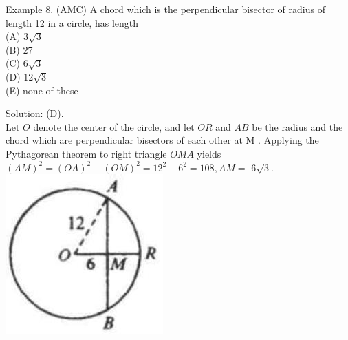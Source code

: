 \documentclass[10pt]{article}
\begin{document}
Example 8. (AMC) A chord which is the perpendicular bisector of radius of length 12 in a circle, has length\\
(A) \(3 \sqrt{3}\)\\
(B) 27\\
(C) \(6 \sqrt{3}\)\\
(D) \(12 \sqrt{3}\)\\
(E) none of these

Solution: (D).\\
Let \(O\) denote the center of the circle, and let \(O R\) and \(A B\) be the radius and the chord which are perpendicular bisectors of each other at M . Applying the Pythagorean theorem to right triangle \(O M A\) yields \((A M)^{2}=(O A)^{2}-(O M)^{2}=12^{2}-6^{2}=108, A M=\) \(6 \sqrt{3}\).\\
\includegraphics[max width=\textwidth, center]{2025_04_17_97bc1f7e44d93c271a88g-150(1)}
\end{document}
